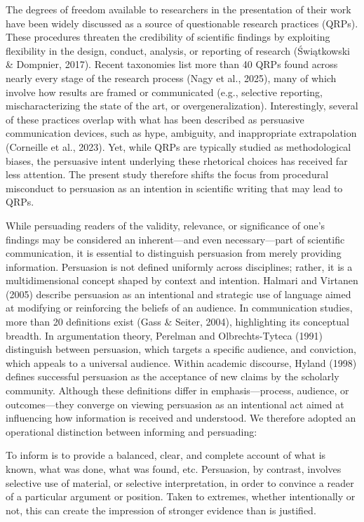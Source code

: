 \documentclass[authordate, meta]{jote-new-article}
\begin{document}
	The degrees of freedom available to researchers in the presentation of their work have been widely discussed as a source of questionable research practices (QRPs). These procedures threaten the credibility of scientific findings by exploiting flexibility in the design, conduct, analysis, or reporting of research (Świątkowski \& Dompnier, 2017). Recent taxonomies list more than 40 QRPs found across nearly every stage of the research process (Nagy et al., 2025), many of which involve how results are framed or communicated (e.g., selective reporting, mischaracterizing the state of the art, or overgeneralization). Interestingly, several of these practices overlap with what has been described as persuasive communication devices, such as hype, ambiguity, and inappropriate extrapolation (Corneille et al., 2023). Yet, while QRPs are typically studied as methodological biases, the persuasive intent underlying these rhetorical choices has received far less attention. The present study therefore shifts the focus from procedural misconduct to persuasion as an intention in scientific writing that may lead to QRPs.



	While persuading readers of the validity, relevance, or significance of one's findings may be considered an inherent—and even necessary—part of scientific communication, it is essential to distinguish persuasion from merely providing information. Persuasion is not defined uniformly across disciplines; rather, it is a multidimensional concept shaped by context and intention. Halmari and Virtanen (2005) describe persuasion as an intentional and strategic use of language aimed at modifying or reinforcing the beliefs of an audience. In communication studies, more than 20 definitions exist (Gass \& Seiter, 2004), highlighting its conceptual breadth. In argumentation theory, Perelman and Olbrechts-Tyteca (1991) distinguish between persuasion, which targets a specific audience, and conviction, which appeals to a universal audience. Within academic discourse, Hyland (1998) defines successful persuasion as the acceptance of new claims by the scholarly community. Although these definitions differ in emphasis—process, audience, or outcomes—they converge on viewing persuasion as an intentional act aimed at influencing how information is received and understood. We therefore adopted an operational distinction between informing and persuading:



	To inform is to provide a balanced, clear, and complete account of what is known, what was done, what was found, etc. Persuasion, by contrast, involves selective use of material, or selective interpretation, in order to convince a reader of a particular argument or position. Taken to extremes, whether intentionally or not, this can create the impression of stronger evidence than is justified. 
\end{document}
